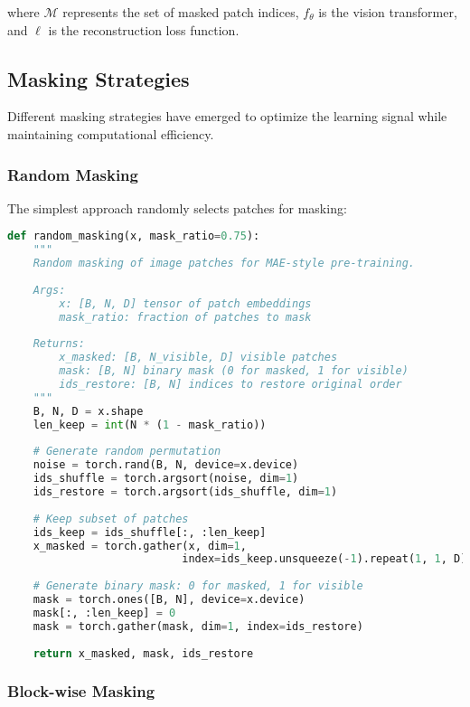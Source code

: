 where $\mathcal{M}$ represents the set of masked patch indices, $f_{\theta}$ is the vision transformer, and $\ell$ is the reconstruction loss function.

\subsection{Masking Strategies}

Different masking strategies have emerged to optimize the learning signal while maintaining computational efficiency.

\subsubsection{Random Masking}

The simplest approach randomly selects patches for masking:

\begin{lstlisting}[language=Python, caption=Random masking implementation for vision transformers]
def random_masking(x, mask_ratio=0.75):
    """
    Random masking of image patches for MAE-style pre-training.
    
    Args:
        x: [B, N, D] tensor of patch embeddings
        mask_ratio: fraction of patches to mask
    
    Returns:
        x_masked: [B, N_visible, D] visible patches
        mask: [B, N] binary mask (0 for masked, 1 for visible)
        ids_restore: [B, N] indices to restore original order
    """
    B, N, D = x.shape
    len_keep = int(N * (1 - mask_ratio))
    
    # Generate random permutation
    noise = torch.rand(B, N, device=x.device)
    ids_shuffle = torch.argsort(noise, dim=1)
    ids_restore = torch.argsort(ids_shuffle, dim=1)
    
    # Keep subset of patches
    ids_keep = ids_shuffle[:, :len_keep]
    x_masked = torch.gather(x, dim=1, 
                           index=ids_keep.unsqueeze(-1).repeat(1, 1, D))
    
    # Generate binary mask: 0 for masked, 1 for visible
    mask = torch.ones([B, N], device=x.device)
    mask[:, :len_keep] = 0
    mask = torch.gather(mask, dim=1, index=ids_restore)
    
    return x_masked, mask, ids_restore
\end{lstlisting}

\subsubsection{Block-wise Masking}

